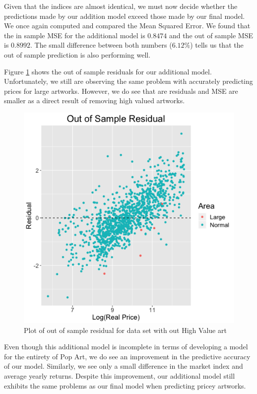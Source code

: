 \documentclass[]{asaproc}\usepackage[]{graphicx}\usepackage[]{color}
\begin{document}
Given that the indices are almost identical, we must now decide whether the predictions made by our addition model exceed those made by our final model. We once again computed and compared the Mean Squared Error. We found that the in sample MSE for the additional model is $0.8474$ and the out of sample MSE is $0.8992$. The small difference between both numbers ($6.12$\%) tells us that the out of sample prediction is also performing well.

Figure \ref{pred_reduced} shows the out of sample residuals for our additional model. Unfortunately, we still are observing the same problem with accurately predicting prices for large artworks. However, we do see that are residuals and MSE are smaller as a direct result of removing high valued artworks. 

\begin{figure}[!ht]

\includegraphics[scale = 0.5]{predict_red}
\caption{Plot of out of sample residual for data set with out High Value art}
\label{pred_reduced}
\end{figure}

Even though this additional model is incomplete in terms of developing a model for the entirety of Pop Art, we do see an improvement in the predictive accuracy of our model. Similarly, we see only a small difference in the market index and average yearly returns. Despite this improvement, our additional model still exhibits the same problems as our final model when predicting pricey artworks. 
\end{document}
